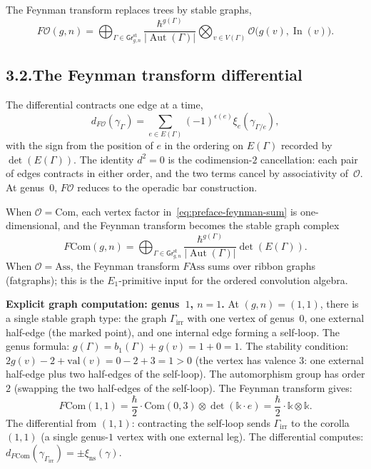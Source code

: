 \documentclass[11pt,reqno]{amsart}
\theoremstyle{definition}
\theoremstyle{remark}
\providecommand{\cO}{\mathcal{O}}
\providecommand{\Bbbk}{\mathbb{k}}
\providecommand{\Ass}{\mathrm{Ass}}
\providecommand{\Com}{\mathrm{Com}}
\numberwithin{equation}{section}
\begin{document}
The Feynman transform replaces trees by stable graphs,
\begin{equation}\label{eq:preface-feynman-sum}
F\cO(g,n)=\bigoplus_{\Gamma\in\mathsf{Gr}^{\mathrm{st}}_{g,n}}\frac{\hbar^{g(\Gamma)}}{|\operatorname{Aut}(\Gamma)|}\bigotimes_{v\in V(\Gamma)}\cO\bigl(g(v),\operatorname{In}(v)\bigr).
\end{equation}

\subsection*{3.2.\enspace The Feynman transform differential}

The differential contracts one edge at a time,
\[
d_{F\cO}(\gamma_\Gamma)=\sum_{e\in E(\Gamma)}(-1)^{\epsilon(e)}\xi_e(\gamma_{\Gamma/e}),
\]
with the sign from the position of $e$ in the ordering on $E(\Gamma)$
recorded by $\det(E(\Gamma))$. The identity $d^2=0$ is the
codimension-$2$ cancellation: each pair of edges contracts in either
order, and the two terms cancel by associativity of~$\cO$. At
genus~$0$, $F\cO$ reduces to the operadic bar construction.

When $\cO=\Com$, each vertex factor in~\eqref{eq:preface-feynman-sum}
is one-dimensional, and the Feynman transform becomes the stable
graph complex
\[
F\Com(g,n)=\bigoplus_{\Gamma\in\mathsf{Gr}^{\mathrm{st}}_{g,n}}\frac{\hbar^{g(\Gamma)}}{|\operatorname{Aut}(\Gamma)|}\det(E(\Gamma)).
\]
When $\cO=\Ass$, the Feynman transform $F\!\Ass$ sums over ribbon
graphs (fatgraphs); this is the $E_1$-primitive input for the ordered
convolution algebra.

\medskip
\noindent\textbf{Explicit graph computation: genus~$1$, $n=1$.}\enspace
At $(g,n)=(1,1)$, there is a single stable graph type: the graph
$\Gamma_{\mathrm{irr}}$ with one vertex of genus~$0$, one external
half-edge (the marked point), and one internal edge forming a
self-loop. The genus formula: $g(\Gamma)=b_1(\Gamma)+g(v)=1+0=1$.
The stability condition: $2g(v)-2+\mathrm{val}(v)=0-2+3=1>0$
(the vertex has valence $3$: one external half-edge plus two
half-edges of the self-loop). The automorphism group has order $2$
(swapping the two half-edges of the self-loop). The Feynman transform
gives:
\[
F\Com(1,1)=\frac{\hbar}{2}\cdot\Com(0,3)\otimes\det(\Bbbk\cdot e)=\frac{\hbar}{2}\cdot\Bbbk\otimes\Bbbk.
\]
The differential from $(1,1)$: contracting the self-loop sends
$\Gamma_{\mathrm{irr}}$ to the corolla $(1,1)$ (a single genus-$1$
vertex with one external leg). The differential computes:
$d_{F\Com}(\gamma_{\Gamma_{\mathrm{irr}}})=\pm\xi_{\mathrm{ns}}(\gamma)$.
\end{document}
